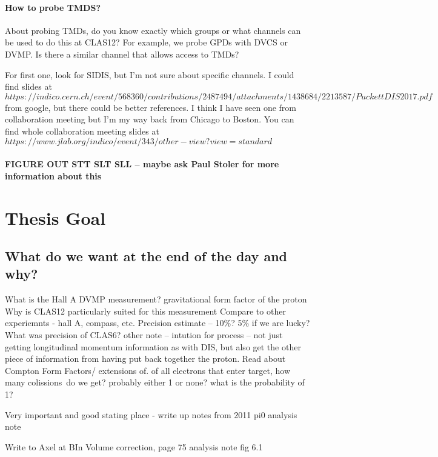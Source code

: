         \subsubsection{How to probe TMDS?}
        About probing TMDs, do you know exactly which groups or what channels can be used to do this at CLAS12? For example, we probe GPDs with DVCS or DVMP. Is there a similar channel that allows access to TMDs?
        
        For first one, look for SIDIS, but I'm not sure about specific channels. I could find slides at
        $https://indico.cern.ch/event/568360/contributions/2487494/attachments/1438684/2213587/PuckettDIS2017.pdf$ from google, but there could be better references. I think I have seen one from collaboration meeting but I'm my way back from Chicago to Boston. You can find whole collaboration meeting slides at $https://www.jlab.org/indico/event/343/other-view?view=standard$

        \subsubsection{FIGURE OUT STT SLT SLL – maybe ask Paul Stoler for more information about this }
\chapter{Thesis Goal}
    \section{What do we want at the end of the day and why?}
    What is the Hall A DVMP measurement?
    gravitational form factor of the proton
    Why is CLAS12 particularly suited for this measurement
    Compare to other experiemnts - hall A, compass, etc. 
    Precision estimate – 10\%? 5\% if we are lucky? What was precision of CLAS6?
    other note – intution for process – not just getting longitudinal momentum information as with DIS, but also get the other piece of information from having put back together the proton. Read about Compton Form Factors/ extensions of. 
    of all electrons that enter target, how many colissions do we get? probably either 1 or none? what is the probability of 1?
    
    Very important and good stating place - write up notes from 2011 pi0 analysis note
    
    Write to Axel at BIn Volume correction, page 75 analysis note fig 6.1
    
